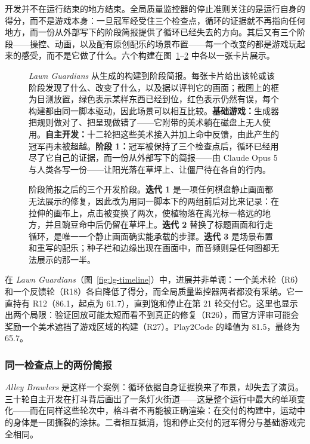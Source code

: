 开发并不在运行结束的地方结束。全局质量监控器的停止准则关注的是运行自身的得分，而不是游戏本身：一旦冠军经受住三个检查点，循环的证据就不再指向任何地方，而一份从外部写下的阶段简报提供了循环已经失去的方向。其后又有三个阶段——操控、动画，以及配有原创配乐的场景布置——每一个改变的都是游戏玩起来的感受，而不是它做了什么。六个构建在图~\ref{fig:lg1}–\ref{fig:lg2} 中各以一张卡片展示。

\begin{figure}[p]
\centering
{}
\caption{\textit{Lawn Guardians} 从生成的构建到阶段简报。每张卡片给出该轮或该阶段发现了什么、改变了什么，以及据以评判它的画面；截图上的框为目测放置，绿色表示某样东西已经到位，红色表示仍然有误，每个构建都由同一脚本驱动，因此场景可以相互比较。\textbf{基础游戏：}生成器把规则做对了、把呈现做错了——它附带的美术躺在磁盘上无人使用。\textbf{自主开发：}十二轮把这些美术接入并加上命中反馈，由此产生的冠军再未被超越。\textbf{阶段 1：}冠军被保持了三个检查点后，循环已经用尽了它自己的证据，而一份从外部写下的简报——由 Claude Opus 5 与人类各写一份——让阳光落在草坪上、让僵尸待在各自的行内。}
\label{fig:lg1}
\end{figure}

\begin{figure}[p]
\centering
{}
\caption{阶段简报之后的三个开发阶段。\textbf{迭代 1} 是一项任何棋盘静止画面都无法展示的修复，因此改为用同一脚本下的两组前后对比来记录：在拉伸的画布上，点击被变换了两次，使植物落在离光标一格远的地方，并且豌豆命中后仍留在草坪上。\textbf{迭代 2} 替换了标题画面和行走循环，是唯一一个静止画面确实能承载的步骤。\textbf{迭代 3} 是场景布置和重写的配乐；种子栏和边缘出现在画面中，而音频则是任何图都无法展示的那一半。}
\label{fig:lg2}
\end{figure}

在 \textit{Lawn Guardians}（图~\ref{fig:lg-timeline}）中，进展并非单调：一个美术轮（R6）和一个反馈轮（R18）各自降低了得分，而全局质量监控器两者都没有采纳。它一直持有 R12（86.1，起点为 61.7），直到饱和停止在第 21 轮交付它。这里也显示出两个局限：验证回放可能太短而看不到真正的修复（R26），而官方评审可能会奖励一个美术遮挡了游戏区域的构建（R27）。Play2Code 的峰值为 81.5，最终为 65.7。

\subsubsection{同一检查点上的两份简报}\label{app:case2}
\textit{Alley Brawlers} 是这样一个案例：循环依据自身证据换来了布景，却失去了演员。三十轮自主开发在打斗背后画出了一条灯火街道——这是整个运行中最大的单项变化——而在同样这些轮次中，格斗者不再能被正确渲染：在交付的构建中，运动中的身体是一团撕裂的涂抹。二者相互抵消，饱和停止交付的冠军得分与基础游戏完全相同。

